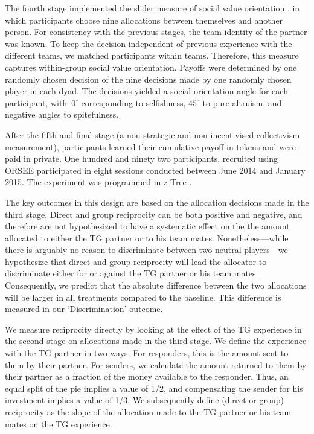 \documentclass[12pt,a4paper]{article}\usepackage[]{graphicx}\usepackage[]{color}
\begin{document}
The fourth stage implemented the slider measure of social value orientation
\citep*{murphy2011measuring,crosetto2012flexible}, in which participants
choose nine allocations between themselves and another person. For
consistency with the previous stages, the team identity of the partner
was known. To keep the decision independent of previous experience
with the different teams, we matched participants within teams. Therefore, this measure captures within-group social value orientation. Payoffs
were determined by one randomly chosen decision of the nine decisions
made by one randomly chosen player in each dyad. The decisions yielded
a social orientation angle for each participant, with~$0^{\circ}$
corresponding to selfishness, $45^{\circ}$ to pure altruism, and
negative angles to spitefulness.

After the fifth and final stage (a non-strategic and non-incentivised
collectivism measurement), participants learned their cumulative payoff in tokens and were paid in private.
One hundred and ninety two participants, recruited using ORSEE \citep*{greiner2015subject} participated in eight sessions conducted between June 2014 and January
2015. %
The experiment was programmed in z-Tree
\citep*{Fischbacher2007}. 

The key outcomes in this design are based on the allocation decisions made in the third stage. Direct and group reciprocity can be both positive and negative, and therefore are not hypothesized to have a systematic effect on the the amount allocated to either the TG partner or to his team mates. Nonetheless---while there is arguably no reason to discriminate between two neutral players---we hypothesize that direct and group reciprocity will lead the allocator to discriminate either for or against the TG partner or his team mates. Consequently, we predict that the absolute difference between the two allocations will be larger in all treatments compared to the baseline. This difference is measured in our `Discrimination' outcome.

We measure reciprocity directly by looking at the effect of the TG experience in the second stage on allocations made in the third stage. We define the experience with the TG partner in two ways. For responders, this is the amount sent to them by their partner. For senders, we calculate the amount returned to them by their partner as a fraction of the money available to the responder. Thus, an equal split of the pie implies a value of 1/2, and compensating the sender for his investment implies a value of 1/3. We subsequently define (direct or group) reciprocity as the slope of the allocation made to the TG partner or his team mates on the TG experience.
\end{document}
